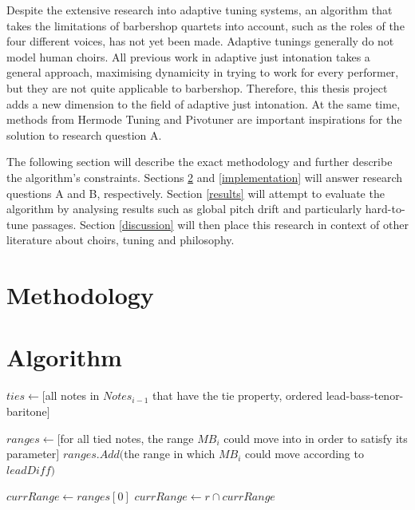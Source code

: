 \documentclass[a4paper]{article}
\begin{document}
Despite the extensive research into adaptive tuning systems, an algorithm that takes the limitations of barbershop quartets into account, such as the roles of the four different voices, has not yet been made. Adaptive tunings generally do not model human choirs. All previous work in adaptive just intonation takes a general approach, maximising dynamicity in trying to work for every performer, but they are not quite applicable to barbershop. Therefore, this thesis project adds a new dimension to the field of adaptive just intonation. At the same time, methods from Hermode Tuning and Pivotuner are important inspirations for the solution to research question A.

The following section will describe the exact methodology and further describe the algorithm's constraints. Sections \ref{algorithm} and \ref{implementation} will answer research questions A and B, respectively. Section \ref{results} will attempt to evaluate the algorithm by analysing results such as global pitch drift and particularly hard-to-tune passages. Section \ref{discussion} will then place this research in context of other literature about choirs, tuning and philosophy.

\section{Methodology}
\label{methodoloy}

\section{Algorithm}
\label{algorithm}

\begin{algorithmic}[1]
	\State $\mathit{ties} \gets [$all notes in $\mathit{Notes}_{i-1}$ that have the tie property, ordered lead-bass-tenor-baritone$]$
	
	\State $\mathit{ranges} \gets [$for all tied notes, the range $\mathit{MB}_i$ could move into in order to satisfy its parameter$]$
	\State $\mathit{ranges.Add}($the range in which $\mathit{MB}_i$ could move according to $\mathit{leadDiff})$
	
	\State{}
	\Else
	\State $\mathit{currRange} \gets \mathit{ranges}[0]$
	\State $\mathit{currRange} \gets r \cap \mathit{currRange}$
	\State {}
	\EndIf
	\EndFor
	
	\State{}
	\EndIf
	\EndProcedure
\end{algorithmic}
\end{document}
